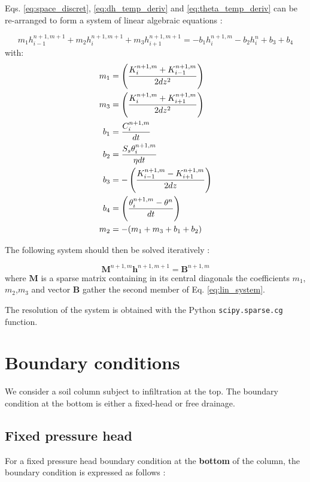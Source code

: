 \documentclass[a4paper,12pt]{article}
\begin{document}
Eqs. \ref{eq:space_discret}, \ref{eq:dh_temp_deriv} and \ref{eq:theta_temp_deriv} can be re-arranged to form a system of linear algebraic equations :

\begin{equation} \label{eq:lin_system}
    m_1 h_{i-1}^{n+1,m+1} + m_2 h_i^{n+1,m+1} + m_3 h_{i+1}^{n+1,m+1} = - b_1 h_i^{n+1,m} - b_2 h_i^n + b_3 + b_4
\end{equation}
with:
\begin{align} \label{eq:coefficients}
    m_1 & = \left(\frac{K_i^{n+1,m}+K_{i-1}^{n+1,m}}{2dz^2}\right)  \\
    m_3 & = \left(\frac{K_i^{n+1,m}+K_{i+1}^{n+1,m}}{2dz^2}\right)  \\
    b_1 & = \frac{C_i^{n+1,m}}{dt} \\
    b_2 & = \frac{S_s\theta_i^{n+1,m}}{\eta dt} \\
    b_3 & = - \left(\frac{K_{i-1}^{n+1,m}-K_{i+1}^{n+1,m}}{2dz}\right) \\
    b_4 & = \left( { \theta_i^{n+1,m} - \theta^n \over dt} \right) \\
    m_2 & = - ( m_1 + m_3 + b_1 + b_2)
\end{align}

The following system should then be solved iteratively : 

\begin{equation} \label{eq:mat_system}
    \mathbf{M}^{n+1,m} \mathbf{h}^{n+1,m+1} = \mathbf{B}^{n+1,m}
\end{equation}
where $\mathbf{M}$ is a sparse matrix containing in its central diagonals the coefficients $m_1$,$m_2$,$m_3$ and vector $\mathbf{B}$ gather the second member of Eq. \ref{eq:lin_system}. 

The resolution of the system is obtained with the Python  \texttt{scipy.sparse.cg}  function.

\section{Boundary conditions}

We consider a soil column subject to infiltration at the top. The boundary condition at the bottom is either a fixed-head or free drainage.

\subsection{Fixed pressure head}

For a fixed pressure head boundary condition at the \textbf{bottom} of the column, the boundary condition is expressed as follows :
\end{document}
